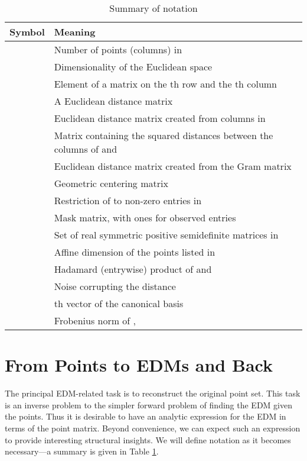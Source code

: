 \documentclass[10pt,double]{IEEEtran}
\begin{document}
\begin{table}[h!]
  \centering
  \caption{Summary of notation}
  \begin{tabular}{@{}p{0.5in}p{2.7in}@{}}
  \toprule
  {\bf Symbol} & {\bf Meaning} \\
  \midrule
   &
  Number of points (columns) in \\
   &
  Dimensionality of the Euclidean space\\
   &
  Element of a matrix  on the th row and the th column\\
   &
  A Euclidean distance matrix \\
   &
  Euclidean distance matrix created from columns in  \\ 
   &
  Matrix containing the squared distances between the columns of  and  \\
   &
  Euclidean distance matrix created from the Gram matrix  \\
   &
  Geometric centering matrix \\
   &
  Restriction of  to non-zero entries in  \\
   &
  Mask matrix, with ones for observed entries \\
   &
  Set of real symmetric positive semidefinite matrices in  \\
   &
  Affine dimension of the points listed in  \\
   &
  Hadamard (entrywise) product of  and  \\
   &
  Noise corrupting the  distance\\
   &
  th vector of the canonical basis\\
   &
  Frobenius norm of , \\
  \bottomrule
  \end{tabular}
  \label{tab:notation-summary}
\end{table}


\section{From Points to EDMs and Back} \label{sec:from_points_to_edms_and_back}
  
The principal EDM-related task is to reconstruct the original point set. This
task is an inverse problem to the simpler forward problem of finding the EDM
given the points. Thus it is desirable to have an analytic expression for the
EDM in terms of the point matrix. Beyond convenience, we can expect such an
expression to provide interesting structural insights. We will define notation
as it becomes necessary---a summary is given in Table
\ref{tab:notation-summary}.
\end{document}
